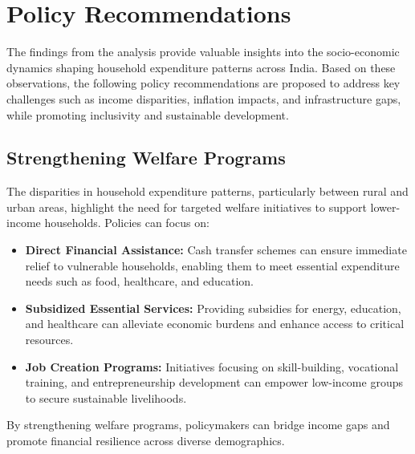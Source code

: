 \documentclass{article}
\begin{document}
\section{Policy Recommendations}

The findings from the analysis provide valuable insights into the socio-economic dynamics shaping household expenditure patterns across India. Based on these observations, the following policy recommendations are proposed to address key challenges such as income disparities, inflation impacts, and infrastructure gaps, while promoting inclusivity and sustainable development.

\subsection{Strengthening Welfare Programs}
The disparities in household expenditure patterns, particularly between rural and urban areas, highlight the need for targeted welfare initiatives to support lower-income households. Policies can focus on:
\begin{itemize}
	\item \textbf{Direct Financial Assistance:} 
	Cash transfer schemes can ensure immediate relief to vulnerable households, enabling them to meet essential expenditure needs such as food, healthcare, and education.
	\item \textbf{Subsidized Essential Services:} 
	Providing subsidies for energy, education, and healthcare can alleviate economic burdens and enhance access to critical resources.
	\item \textbf{Job Creation Programs:} 
	Initiatives focusing on skill-building, vocational training, and entrepreneurship development can empower low-income groups to secure sustainable livelihoods.
\end{itemize}
By strengthening welfare programs, policymakers can bridge income gaps and promote financial resilience across diverse demographics.
\end{document}
